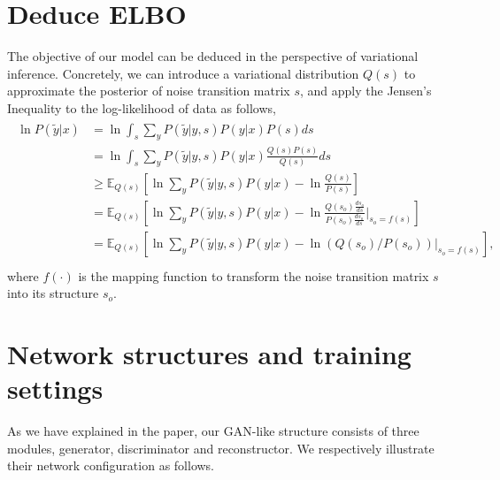 \documentclass{article}
\begin{document}
\section{Deduce ELBO}\label{app:elbo}
The objective of our model can be deduced in the perspective of variational inference. Concretely, we can introduce a variational distribution $Q(s)$ to approximate the posterior of noise transition matrix $s$, and apply the Jensen's Inequality to the log-likelihood of data as follows,
\begin{align}\label{eq:elbo}
\begin{split}
\ln{P(\tilde{y}|x)}
& = \ln{\int_s\sum_y P(\tilde{y}|y,s)P(y|x)P(s)ds} \\
& = \ln{\int_s\sum_y P(\tilde{y}|y,s)P(y|x)\frac{Q(s)P(s)}{Q(s)}ds} \\
& \geq \mathbb{E}_{Q(s)} \left[ \ln{\sum_y P(\tilde{y}|y,s)P(y|x)} - \ln{\frac{Q(s)}{P(s)}}\right] \\
& = \mathbb{E}_{Q(s)} \left[ \ln{\sum_y P(\tilde{y}|y,s)P(y|x)} - \ln{\frac{Q(s_o)\frac{ds_o}{ds}}{P(s_o)\frac{ds_o}{ds}}}\bigg|_{s_o = f(s)}\right] \\
& = \mathbb{E}_{Q(s)} \left[ \ln{\sum_y P(\tilde{y}|y,s)P(y|x)} - \ln{\left(Q(s_o)\slash P(s_o)\right)}\bigg|_{s_o = f(s)}\right], \\
\end{split}
\end{align}
where $f(\cdot)$ is the mapping function to transform the noise transition matrix $s$ into its structure $s_o$.

\section{Network structures and training settings}\label{app:net}
As we have explained in the paper, our GAN-like structure consists of three modules, generator, discriminator and reconstructor. We respectively illustrate their network configuration as follows.
\end{document}
